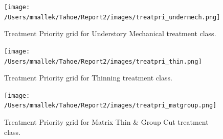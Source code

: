 \begin{figure}
\centering
\texttt{[image: /Users/mmallek/Tahoe/Report2/images/treatpri\_undermech.png]}
\caption{Treatment Priority grid for Understory Mechanical treatment class.} 
\label{treatpri_undermech}
\end{figure}

\begin{figure}
\centering
\texttt{[image: /Users/mmallek/Tahoe/Report2/images/treatpri\_thin.png]}
\caption{Treatment Priority grid for Thinning treatment class.} 
\label{treatpri_thin}
\end{figure}

\begin{figure}
\centering
\texttt{[image: /Users/mmallek/Tahoe/Report2/images/treatpri\_matgroup.png]}
\caption{Treatment Priority grid for Matrix Thin \& Group Cut treatment class.} 
\label{treatpri_matgroup}
\end{figure}









